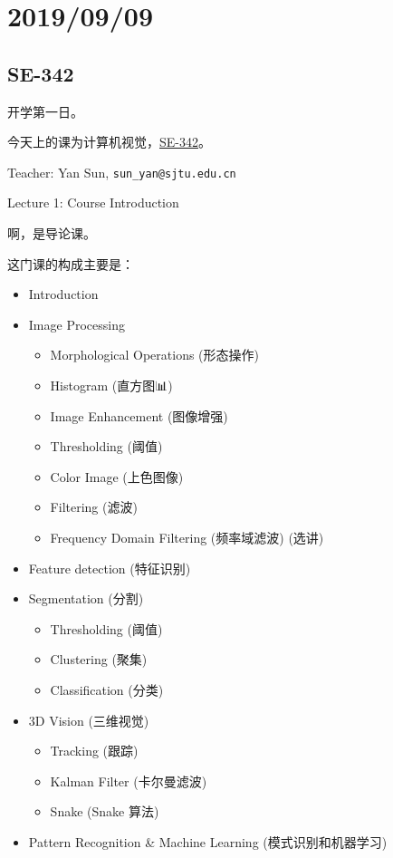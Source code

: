 \documentclass[
]{article}
\date{}
\begin{document}
\hypertarget{header-n0}{%
\section{2019/09/09}\label{header-n0}}

\hypertarget{header-n2}{%
\subsection{SE-342}\label{header-n2}}

开学第一日。

今天上的课为计算机视觉，\href{https://github.com/yuetsin/2019-2020-autumn-semester\#se-342}{SE-342}。

Teacher: Yan Sun, \texttt{sun\_yan@sjtu.edu.cn}

Lecture 1: Course Introduction

啊，是导论课。

这门课的构成主要是：

\begin{itemize}
\item
  Introduction
\item
  Image Processing

  \begin{itemize}
  \item
    Morphological Operations (形态操作)
  \item
    Histogram (直方图📊)
  \item
    Image Enhancement (图像增强)
  \item
    Thresholding (阈值)
  \item
    Color Image (上色图像)
  \item
    Filtering (滤波)
  \item
    Frequency Domain Filtering (频率域滤波) (选讲)
  \end{itemize}
\item
  Feature detection (特征识别)
\item
  Segmentation (分割)

  \begin{itemize}
  \item
    Thresholding (阈值)
  \item
    Clustering (聚集)
  \item
    Classification (分类)
  \end{itemize}
\item
  3D Vision (三维视觉)

  \begin{itemize}
  \item
    Tracking (跟踪)
  \item
    Kalman Filter (卡尔曼滤波)
  \item
    Snake (Snake 算法)
  \end{itemize}
\item
  Pattern Recognition \& Machine Learning (模式识别和机器学习)
\end{itemize}
\end{document}
